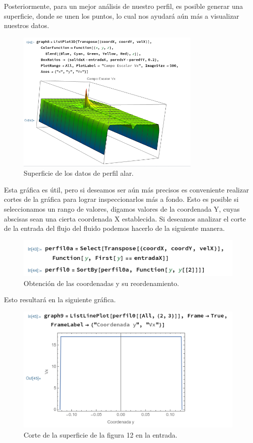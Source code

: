 \documentclass[12pt, letterpaper]{article}
\begin{document}
Posteriormente, para un mejor análisis de nuestro perfil, es posible generar una superficie, donde se unen los puntos, lo cual nos ayudará aún más a visualizar nuestros datos.

\begin{figure}[H]
	\centering
	\includegraphics[width=0.8\textwidth]{17.png}
	\caption{Superficie de los datos de perfil alar.}
\end{figure}

Esta gráfica es útil, pero si deseamos ser aún más precisos es conveniente realizar cortes de la gráfica para lograr inspeccionarlos más a fondo. Esto es posible si seleccionamos un rango de valores, digamos valores de la coordenada Y, cuyas abscisas sean una cierta coordenada X establecida. Si deseamos analizar el corte de la entrada del flujo del fluido podemos hacerlo de la siguiente manera.

\begin{figure}[H]
	\centering
	\includegraphics[width=\textwidth]{18.png}
	\caption{Obtención de las coordenadas y su reordenamiento.}
\end{figure}

Esto resultará en la siguiente gráfica.

\begin{figure}[H]
	\centering
	\includegraphics[width=\textwidth]{19.png}
	\caption{Corte de la superficie de la figura 12 en la entrada.}
\end{figure}
\end{document}
